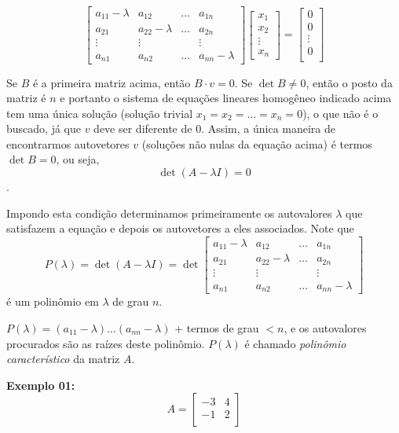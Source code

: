 \documentclass[oneside,a4paper,12pt]{article}
\begin{document}
$$\left[
\begin{array}{cccc}
a_{11} - \lambda	&	a_{12}				&	\dots	& a_{1n}\\
a_{21}				&	a_{22} - \lambda	&	\dots	& a_{2n} \\
\vdots				&	\vdots				&			& \vdots	\\
a_{n1}				&	a_{n2}				&	\dots	& a_{nn} - \lambda
\end{array}
\right] \left[
\begin{array}{c}
x_1	\\
x_2	\\
\vdots	\\
x_n
\end{array}
\right] = \left[
\begin{array}{c}
0	\\
0	\\
\vdots \\
0	\\
\end{array}
\right]$$

Se $B$ é a primeira matriz acima, então $B \cdot v = 0$. Se $\det B \neq 0$, então o posto da matriz é $n$ e portanto o sistema de equações lineares homogêneo indicado acima tem uma única solução (solução trivial $x_1 = x_2 = \dots = x_n = 0$), o que não é o buscado, já que $v$ deve ser diferente de $0$. Assim, a única maneira de encontrarmos autovetores $v$ (soluções não nulas da equação acima) é termos $\det B = 0$, ou seja,
$$\det(A - \lambda I) = 0$$.

Impondo esta condição determinamos primeiramente os autovalores $\lambda$ que satisfazem a equação e depois os autovetores a eles associados. Note que
$$P(\lambda) = \det(A - \lambda I) = \det \left[
\begin{array}{cccc}
a_{11} - \lambda	&	a_{12}				&	\dots	& a_{1n}\\
a_{21}				&	a_{22} - \lambda	&	\dots	& a_{2n} \\
\vdots				&	\vdots				&			& \vdots	\\
a_{n1}				&	a_{n2}				&	\dots	& a_{nn} - \lambda
\end{array}
\right] $$
é um polinômio em $\lambda$ de grau $n$.

$P(\lambda) = (a_{11} - \lambda) \dots (a_{nn} - \lambda)$ + termos de grau $< n$, e os autovalores procurados são as raízes deste polinômio. $P(\lambda)$ é chamado \emph{polinômio característico} da matriz $A$.

{\bf Exemplo 01:} 
$$A = \left[
\begin{array}{cc}
-3	&	4 \\
-1	&	2 \\
\end{array}
\right]$$
\end{document}
